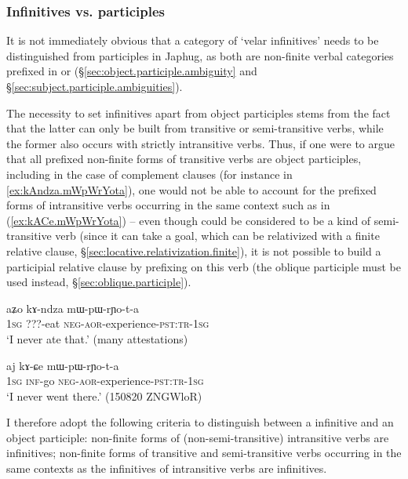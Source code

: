 \subsubsection{Infinitives vs. participles} \label{sec:infinitives.participles}
It is not immediately obvious that a category of `velar infinitives' needs to be distinguished from participles in Japhug, as both are non-finite verbal categories prefixed in  or  (§\ref{sec:object.participle.ambiguity} and §\ref{sec:subject.participle.ambiguities}). 

The necessity to set  infinitives apart from object participles stems from the fact that the latter can only be built from transitive or semi-transitive verbs, while the former also occurs with strictly intransitive verbs. Thus, if one were to argue that all prefixed non-finite forms of transitive verbs are object participles, including in the case of complement clauses (for instance  in \ref{ex:kAndza.mWpWrYota}), one would not be able to account for the prefixed forms of intransitive verbs occurring in the same context such as  in (\ref{ex:kACe.mWpWrYota}) -- even though  could be considered to be a kind of semi-transitive verb (since it can take a goal, which can be relativized with a finite relative clause, §\ref{sec:locative.relativization.finite}), it is not possible to build a participial relative clause by prefixing  on this verb (the oblique participle  must be used instead, §\ref{sec:oblique.participle}).

\begin{exe}
\ex \label{ex:kAndza.mWpWrYota}
\gll aʑo kɤ-ndza mɯ-pɯ-rɲo-t-a \\
\textsc{1sg} ???-eat \textsc{neg}-\textsc{aor}-experience-\textsc{pst}:\textsc{tr}-\textsc{1sg} \\
\glt `I never ate that.' (many attestations)
\end{exe}

\begin{exe}
\ex \label{ex:kACe.mWpWrYota}
\gll  aj kɤ-ɕe mɯ-pɯ-rɲo-t-a \\
\textsc{1sg} \textsc{inf}-go \textsc{neg}-\textsc{aor}-experience-\textsc{pst}:\textsc{tr}-\textsc{1sg}  \\
\glt `I never went there.' (150820 ZNGWloR) 
\end{exe}

I therefore adopt the following criteria to distinguish between a  infinitive and an object participle:   non-finite forms of (non-semi-transitive) intransitive verbs are infinitives;  non-finite forms of transitive and semi-transitive verbs occurring in the same contexts as the infinitives of intransitive verbs are infinitives.

